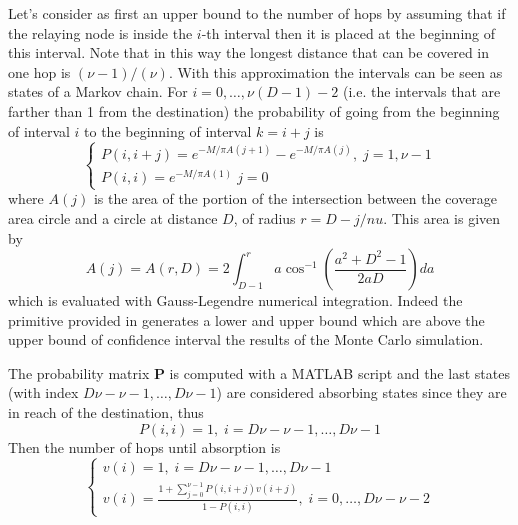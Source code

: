 \documentclass[10pt]{article}
\begin{document}
Let's consider as first an upper bound to the number of hops by assuming that if the relaying node is inside the $i$-th interval then it is placed at the beginning of this interval. Note that in this way the longest distance that can be covered in one hop is $(\nu - 1) / (\nu)$. With this approximation the intervals can be seen as states of a Markov chain. For $i = 0, \dots, \nu (D - 1) - 2$ (i.e. the intervals that are farther than 1 from the destination) the probability of going from the beginning of interval $i$ to the beginning of interval $k = i + j$ is 
\begin{equation}
\begin{cases}
  P(i, i + j) = e^{-M/\pi A(j+1)} - e^{-M/\pi A(j)}, \; j = 1, \nu-1 \\
  P(i, i) = e^{-M/\pi A(1)} \; j = 0
\end{cases}
\end{equation}
where $A(j)$ is the area of the portion of the intersection between the coverage area circle and a circle at distance $D$, of radius $r = D - j/nu$. This area is given by
\begin{equation}
  A(j) = A(r, D) = 2\int_{D-1}^r a \cos^{-1} \left( \frac{a^2 + D^2 - 1}{2aD} \right) da
\end{equation}
which is evaluated with Gauss-Legendre numerical integration. Indeed the primitive provided in \cite{tmc} generates a lower and upper bound which are above the upper bound of confidence interval the results of the Monte Carlo simulation. 

The probability matrix $\mathbf{P}$ is computed with a MATLAB script and the last states (with index $D\nu - \nu - 1, \dots, D\nu -1 $) are considered absorbing states since they are in reach of the destination, thus
\begin{equation}
  P(i, i) = 1, \; i = D\nu - \nu - 1, \dots, D\nu -1 
\end{equation} 
Then the number of hops until absorption is 
\begin{equation}
\begin{cases}
  v(i) = 1, \; i = D\nu - \nu - 1, \dots, D\nu -1  \\
  v(i) = \frac{1+\sum_{j = 0}^{\nu - 1} P(i, i + j) v(i + j)}{1-P(i, i)}, \; i = 0, \dots, D\nu - \nu - 2
\end{cases}
\end{equation}
\end{document}
